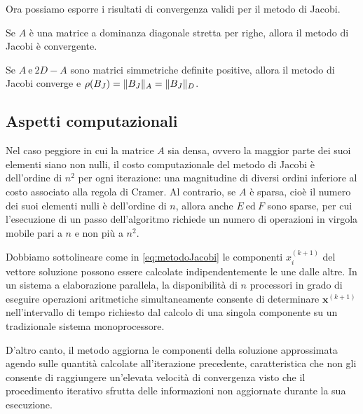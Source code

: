 Ora possiamo esporre i risultati di convergenza validi per il metodo di Jacobi.
\begin{teorema}
    \label{teo:convergenzaDominanzaDiagonaleStretta}
    Se $A$ \`e una matrice a dominanza diagonale stretta per righe, allora il metodo di Jacobi \`e convergente.
\end{teorema}
\begin{teorema}
    Se $A \ \text{e} \ 2D - A$ sono matrici simmetriche definite positive, allora il metodo di Jacobi converge e $\rho(B_{J}) = \lVert B_{J}\rVert_{A} = \lVert B_{J}\rVert_{D}$.
\end{teorema}
\subsection{Aspetti computazionali}
\nocite{BiniAnalisiNumerica2013}
Nel caso peggiore in cui la matrice $A$ sia densa, ovvero la maggior parte dei suoi elementi siano non nulli,
il costo computazionale del metodo di Jacobi \`e dell'ordine di $n^{2}$ \si{\flops} per ogni iterazione: una magnitudine di diversi ordini inferiore
al costo associato alla regola di Cramer.\newline
Al contrario, se $A$ \`e sparsa, cio\`e il numero dei suoi elementi nulli \`e dell'ordine di $n$, allora anche $E \ \text{ed} \ F$ 
sono sparse, per cui l'esecuzione di un passo dell'algoritmo richiede un numero di operazioni in virgola mobile pari a $n$ e non 
pi\`u a $n^2$.

Dobbiamo sottolineare come in \eqref{eq:metodoJacobi} le componenti $x_{i}^{(k+1)}$ del vettore soluzione possono essere calcolate indipendentemente le une dalle altre. \newline 
In un sistema a elaborazione parallela, la disponibilit\`a di $n$ processori in grado di eseguire operazioni aritmetiche simultaneamente consente di determinare $\mathbf{x}^{(k+1)}$ nell'intervallo di tempo richiesto dal calcolo di una singola componente su un tradizionale sistema monoprocessore.

D'altro canto, il metodo aggiorna le componenti della soluzione approssimata agendo sulle quantit\`a calcolate all'iterazione precedente, caratteristica che non gli consente di raggiungere un'elevata velocit\`a di convergenza visto che il procedimento iterativo sfrutta delle informazioni non aggiornate durante la sua esecuzione.

